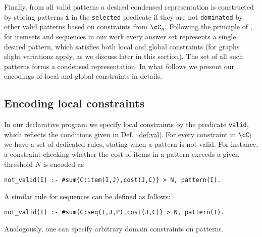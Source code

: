 Finally, from all valid patterns a desired condensed representation is constructed by storing patterns \texttt{i} in the \texttt{selected} predicate if they are not \texttt{dominated} by other valid patterns based on constraints from $\cC_g$. Following the principle of \parencite{DBLP:conf/lpnmr/Jarvisalo11}, for itemsets and sequences in our work every answer set represents a single desired pattern, which satisfies both local and global constraints (for graphs slight variations apply, as we discuss later in this section). The set of all such patterns forms a condensed representation. In what follows we present our encodings of local and global constraints in details. 

\subsection{Encoding local constraints} 

In our declarative program we specify local constraints by the predicate \texttt{valid}, which reflects the conditions given in Def.~\ref{def:val}. For every constraint in $\cC_l$ we have a set of dedicated rules, stating when a pattern is not valid. 
For instance, a constraint checking whether the cost of items in a pattern exceeds a given threshold $N$ is encoded as %

\small{\begin{center}
\texttt{not\_valid(I) :- \#sum\{C:item(I,J),cost(J,C)\} > N, pattern(I).}
\end{center}}

\normalsize{A similar rule for sequences can be defined as follows: }%

\small{\begin{center}
\texttt{not\_valid(I) :- \#sum\{C:seq(I,J,P),cost(J,C)\} > N, pattern(I).}
\end{center}}

 
\normalsize{Analogously, one can specify arbitrary domain constraints on patterns. }

